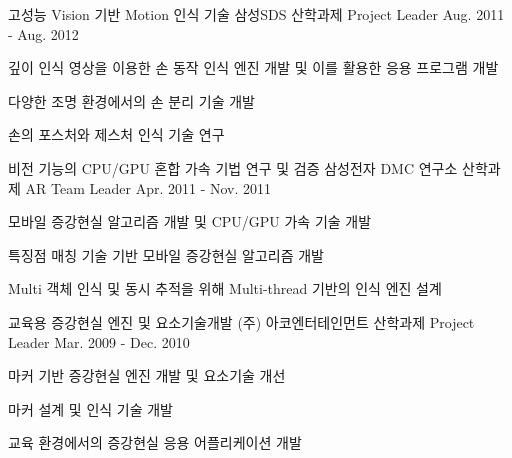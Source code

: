 \begin{cventries}
  \cventry
    {고성능 Vision 기반 Motion 인식 기술} %
    {삼성SDS 산학과제} %
    {Project Leader} %
    {Aug. 2011 - Aug. 2012} %
    {
      \begin{cvitems} %
        \item {깊이 인식 영상을 이용한 손 동작 인식 엔진 개발 및 이를 활용한 응용 프로그램 개발}
        \item {다양한 조명 환경에서의 손 분리 기술 개발}
        \item {손의 포스처와 제스처 인식 기술 연구}
      \end{cvitems}
    }

  \cventry
    {비전 기능의 CPU/GPU 혼합 가속 기법  연구 및 검증} %
    {삼성전자 DMC 연구소 산학과제} %
    {AR Team Leader} %
    {Apr. 2011 - Nov. 2011} %
    {
      \begin{cvitems} %
        \item{모바일 증강현실 알고리즘 개발 및 CPU/GPU 가속 기술 개발}
        \item {특징점 매칭 기술 기반 모바일 증강현실 알고리즘 개발}
        \item {Multi 객체 인식 및 동시 추적을 위해 Multi-thread 기반의 인식 엔진 설계}
      \end{cvitems}
    }

  \cventry
    {교육용 증강현실 엔진 및 요소기술개발} %
    {(주) 아코엔터테인먼트 산학과제} %
    {Project Leader} %
    {Mar. 2009 - Dec. 2010} %
    {
      \begin{cvitems} %
        \item {마커 기반 증강현실 엔진 개발 및 요소기술 개선}
        \item {마커 설계 및 인식 기술 개발}
        \item {교육 환경에서의 증강현실 응용 어플리케이션 개발}
      \end{cvitems}
    }


\end{cventries}
